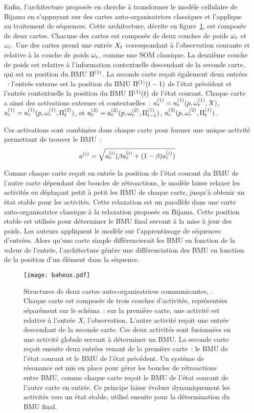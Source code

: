 \documentclass[../main]{subfiles}
\begin{document}
Enfin, l'architecture proposée en \cite{baheux_towards_2014} cherche à transformer le modèle cellulaire de Bijama en s'appuyant sur des cartes auto-organisatrices classiques et l'applique au traitement de séquences. Cette architecture, décrite en figure~\ref{fig:baheux}, est composée de deux cartes. 
Chacune des cartes est composée de deux couches de poids $\omega_e$ et $\omega_c$. Une des cartes prend une entrée $X_t$ correspondant à l'observation courante et relative à la couche de poids $\omega_e$, comme une SOM classique. 
La deuxième couche de poids est relative à l'information contextuelle descendant de la seconde carte, qui est sa position du BMU $\Pi^{({1})}$.
La seconde carte reçoit également deux entrées ~: l'entrée externe est la position du BMU $\Pi^{({1})}(t-1)$ de l'état précédent et l'entrée contextuelle la position du BMU $\Pi^{({1})}(t)$ de l'état courant. 
Chaque carte a ainsi des activations externes et contextuelles~: $a_e^{({1})} = a_e^{({1})}(p, \omega_e^{({1})},X)$, $a_c^{({1})} =  a_c^{({1})}(p, \omega_c^{({1})},\Pi^{({2})}_t)$, et $a_e^{({2})} = a_e^{({2})}(p, \omega_e^{({2})},\Pi^{({1})}_{t-1})$, $a_c^{({2})}(p, \omega_c^{({2})}, \Pi^{({1})}_t)$.

Ces activations sont combinées dans chaque carte pour former une unique activité permettant de trouver le BMU~:
$$
a^{({i})} = \sqrt{a_e^{({i})}(\beta a_e^{({i})} + (1-\beta) a_c^{({i})})}
$$

Comme chaque carte reçoit en entrée la position de l'état courant du BMU de l'autre carte dépendant des boucles de rétroactions, le modèle laisse relaxer les activités en déplaçant petit à petit les BMU de chaque carte, jusqu'à obtenir un état stable pour les activités. Cette relaxation est un parallèle dans une carte auto-organisatrice classique à la relaxation proposée en Bijama.
Cette position stable est utilisée pour déterminer le BMU final servant à la mise à jour des poids.
Les auteurs appliquent le modèle sur  l'apprentissage de séquences d'entrées. Alors qu'une carte simple différencierait les BMU en fonction de la valeur de l'entrée, l'architecture génère une différenciation des BMU en fonction de la position d'un élément dans la séquence.


\begin{figure}
    \centering
    \texttt{[image: baheux.pdf]}
    \caption{Structures de deux cartes auto-organisatrices communicantes, \parencite{baheux_towards_2014}. Chaque carte est composée de trois couches d'activités, représentées séparément sur le schéma~: sur la première carte, une activité est relative à l'entrée $X$, l'observation. L'autre activité reçoit une entrée descendant de la seconde carte. Ces deux activités sont fusionnées en une activité globale servant à déterminer un BMU. La seconde carte reçoit ensuite deux entrées venant de la première carte~: le BMU de l'état courant et le BMU de l'état précédent. Un système de résonance est mis en place pour gérer les boucles de rétroactions entre BMU, comme chaque carte reçoit le BMU de l'état courant de l'autre carte en entrée. Ce principe laisse évoluer dynamiquement les activités vers un état stable, utilisé ensuite pour la détermination du BMU final.\label{fig:baheux}}
\end{figure}
\end{document}
